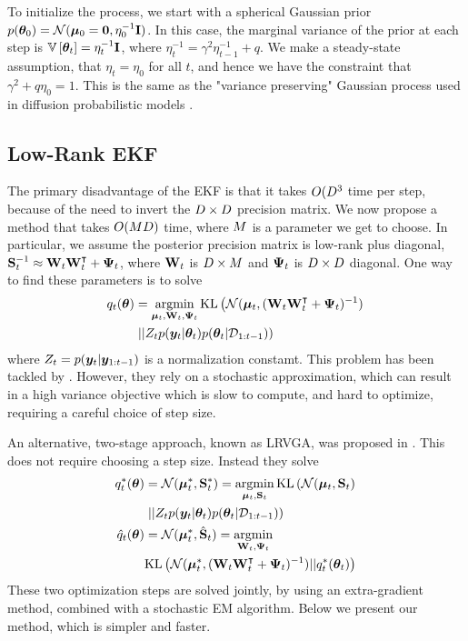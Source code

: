 To initialize the process,
we start with a spherical Gaussian prior
$p({\bm{\theta}}_0) = \mathcal{N}(\boldsymbol{\mu}_0=\boldsymbol{0}, \eta_0^{-1} \mathbf{I})$.
In this case, 
the marginal variance of the prior at each step is
 $\mathbb{V}\left[ {{\bm{\theta}}_t}\right] = \eta_t^{-1} \mathbf{I}$,
where $\eta_t^{-1} = \gamma^2 \eta_{t-1}^{-1} + q$.
We make a steady-state assumption,
that $\eta_t=\eta_0$ for all $t$,
and hence we have the constraint that 
$\gamma^{2}+q\eta_{0}=1$.
This is the same as the "variance preserving" Gaussian process used in diffusion probabilistic models
\citep{song2020score,ho2020denoising}.



\subsection{Low-Rank EKF}

The primary disadvantage of the EKF is that
it takes $O(D^3$ time per step, because of the need to invert
the $D \times D$ precision matrix.
We now propose a method that takes $O(M D)$ time,
where $M$ is a parameter we get to choose.
In particular, we assume
the posterior precision matrix is low-rank plus diagonal,
$\mathbf{S}_t^{-1} \approx \mathbf{W}_t\mathbf{W}_t^\intercal  + \boldsymbol{\Psi}_t$,
where $\mathbf{W}_t$ is $D \times M$ and
$\boldsymbol{\Psi}_t$ is $D \times D$ diagonal.
One way to find these parameters is to solve
\begin{align}
  q_t(\vtheta) &= \argmin_{\vmu_t, \vW_t, \vPsi_t}
  \text{KL}\left( \gauss(\vmu_t, (\vW_t \vW_t^\trans + \vPsi_t)^{-1})   \right. \\
   & \left.
    || Z_t p(\vy_t|\vtheta_t) p(\vtheta_t|\data_{1:t-1}) \right)
  \end{align}
where $Z_t = p({\bm{y}}_t|{\bm{y}}_{1:t-1})$ is a normalization constamt.
This problem has been tackled by \citep{Ong2018}.
However, they rely on a stochastic approximation,
which can result in a high variance objective which is slow to compute,
and hard to optimize, requiring a careful choice of step size.

An alternative, two-stage approach, known as LRVGA,  was proposed in
\citep{LRVGA}.
This does not require choosing a step size.
Instead they solve
\begin{align}
  q^*_t(\vtheta) &= \gauss(\vmu_t^*,\vS_t^*) = \argmin_{\vmu_t, \vS_t}
  \text{KL}\left( \gauss(\vmu_t,\vS_t)   \right. \\
   & \left.
  || Z_t p(\vy_t|\vtheta_t) p(\vtheta_t|\data_{1:t-1}) \right)
  \label{eqn:LRVGA1}
  \\
  \hat{q}_t(\vtheta) &= \gauss(\vmu_t^*,\hat{\vS}_t) = \argmin_{\vW_t, \vPsi_t} \\
  & \text{KL}\left( \gauss(\vmu_t^*, (\vW_t \vW_t^\trans + \vPsi_t)^{-1})
  || q_t^*(\vtheta_t) \right)
    \label{eqn:LRVGA2}
\end{align}
These two optimization steps are solved jointly,
by using an extra-gradient method,
combined with a stochastic EM algorithm.
Below we present our method, which is simpler and faster.



